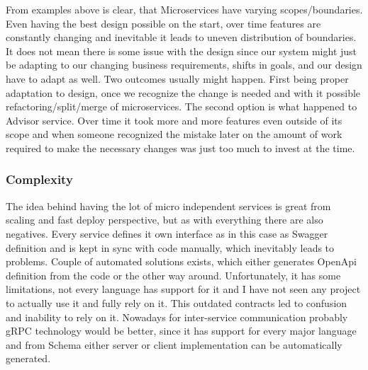 From examples above is clear, that Microservices have varying scopes/boundaries. Even having the best design possible on the start, over time features are constantly changing and inevitable it leads to uneven distribution of boundaries. It does not mean there is some issue with the design since our system might just be adapting to our changing business requirements, shifts in goals, and our design have to adapt as well. Two outcomes usually might happen. First being proper adaptation to design, once we recognize the change is needed and with it possible refactoring/split/merge of microservices. The second option is what happened to Advisor service. Over time it took more and more features even outside of its scope and when someone recognized the mistake later on the amount of work required to make the necessary changes was just too much to invest at the time.

\subsubsection{Complexity}
The idea behind having the lot of micro independent services is great from scaling and fast deploy perspective, but as with everything there are also negatives. Every service defines it own interface as in this case as Swagger definition and is kept in sync with code manually, which inevitably leads to problems. Couple of automated solutions exists, which either generates OpenApi definition from the code or the other way around. Unfortunately, it has some limitations, not every language has support for it and I have not seen any project to actually use it and fully rely on it. This outdated contracts led to confusion and inability to rely on it. Nowadays for inter-service communication probably gRPC technology would be better, since it has support for every major language and from Schema either server or client implementation can be automatically generated.

